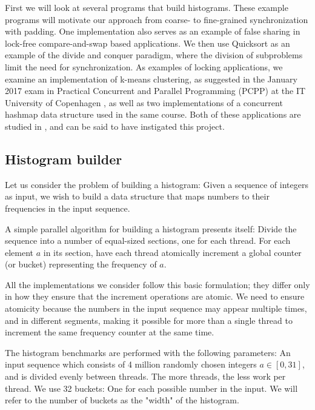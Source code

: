 First we will look at several programs that build histograms. These example
programs will motivate our approach from coarse- to fine-grained synchronization
with padding. One implementation also serves as an example of false sharing in
lock-free compare-and-swap based applications. We then use Quicksort as an example of the
divide and conquer paradigm, where the division of subproblems limit the need
for synchronization.
As examples of locking applications, we examine an implementation of k-means
clustering, as suggested in the January 2017 exam in Practical Concurrent and
Parallel Programming (PCPP) at the IT University of Copenhagen \cite{kmeansexam,
kmeansexamcode}, as well as two implementations of a concurrent hashmap data structure
used in the same course. Both of these applications are studied in
\cite{mystery}, and can be said to have instigated this project.

\subsection{Histogram builder}

Let us consider the problem of building a histogram: Given a sequence of
integers as input, we wish to build a data structure that maps numbers to their
frequencies in the input sequence.

A simple parallel algorithm for building a histogram presents itself: Divide the
sequence into a number of equal-sized sections, one for each thread. For each
element $a$ in its section, have each thread atomically increment a global
counter (or bucket) representing the frequency of $a$.

All the implementations we consider follow this basic formulation; they differ
only in how they ensure that the increment operations are atomic. We need to
ensure atomicity because the numbers in the input sequence may appear multiple
times, and in different segments, making it possible for more than a single
thread to increment the same frequency counter at the same time.

The histogram benchmarks are performed with the following parameters: An input
sequence which consists of 4 million randomly chosen integers $a\in[0,31]$, and
is divided evenly between threads. The more threads, the less work per thread.
We use 32 buckets: One for each possible number in the input. We will refer to
the number of buckets as the "width" of the histogram.

